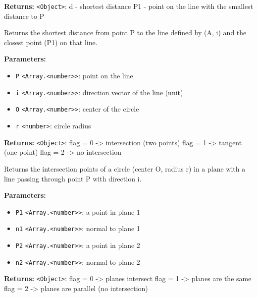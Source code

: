 \documentclass[12pt,a4paper]{article}
\begin{document}
\noindent \textbf{Returns:} \texttt{<Object>}: d   - shortest distance
  P1  - point on the line with the smallest distance to P

\noindent Returns the shortest distance from point P to the line defined by (A, i)
and the closest point (P1) on that line.

\vspace{5mm}
\noindent {}


\noindent \textbf{Parameters:}
\begin{itemize}
  \item \texttt{P} \texttt{<Array.<number>>}: point on the line
  \item \texttt{i} \texttt{<Array.<number>>}: direction vector of the line (unit)
  \item \texttt{O} \texttt{<Array.<number>>}: center of the circle
  \item \texttt{r} \texttt{<number>}: circle radius
\end{itemize}

\noindent \textbf{Returns:} \texttt{<Object>}: flag = 0 -> intersection (two points)
  flag = 1 -> tangent (one point)
  flag = 2 -> no intersection

\noindent Returns the intersection points of a circle (center O, radius r) 
in a plane with a line passing through point P with direction i.

\vspace{5mm}
\noindent {}


\noindent \textbf{Parameters:}
\begin{itemize}
  \item \texttt{P1} \texttt{<Array.<number>>}: a point in plane 1
  \item \texttt{n1} \texttt{<Array.<number>>}: normal to plane 1
  \item \texttt{P2} \texttt{<Array.<number>>}: a point in plane 2
  \item \texttt{n2} \texttt{<Array.<number>>}: normal to plane 2
\end{itemize}

\noindent \textbf{Returns:} \texttt{<Object>}: flag = 0 -> planes intersect
  flag = 1 -> planes are the same
  flag = 2 -> planes are parallel (no intersection)
\end{document}
